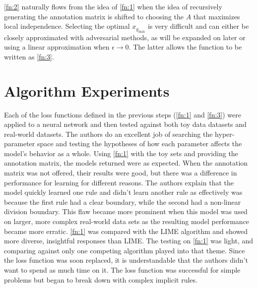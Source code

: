 \documentclass[twoside,11pt]{article}
\begin{document}
\cref{fn:2} naturally flows from the idea of \cref{fn:1} when the idea of recursively generating the annotation matrix is shifted to choosing the $A$ that maximizes local independence. Selecting the optimal $x_{g_\text{max}}$ is very difficult and can either be closely approximated with adversarial methods, as will be expanded on later or using a linear approximation when $\epsilon \rightarrow 0$. The latter allows the function to be written as \cref{fn:3}.


\section{Algorithm Experiments}
\label{sec:alg exp}
Each of the loss functions defined in the previous steps (\cref{fn:1} and \cref{fn:3}) were applied to a neural network and then tested against both toy data datasets and real-world datasets. The authors do an excellent job of searching the hyper-parameter space and testing the hypotheses of how each parameter affects the model's behavior as a whole. Using \cref{fn:1} with the toy sets and providing the annotation matrix, the models returned were as expected. When the annotation matrix was not offered, their results were good, but there was a difference in performance for learning for different reasons. The authors explain that the model quickly learned one rule and didn't learn another rule as effectively was because the first rule had a clear boundary, while the second had a non-linear division boundary. This flaw became more prominent when this model was used on larger, more complex real-world data sets as the resulting model performance became more erratic. \cref{fn:1} was compared with the LIME algorithm and showed more diverse, insightful responses than LIME. The testing on \cref{fn:1} was light, and comparing against only one competing algorithm played into that theme. Since the loss function was soon replaced, it is understandable that the authors didn't want to spend as much time on it. The loss function was successful for simple problems but began to break down with complex implicit rules. 
\end{document}
